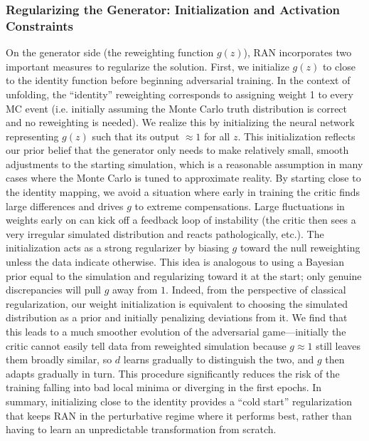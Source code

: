         \subsubsection{Regularizing the Generator: Initialization and Activation Constraints}
            On the generator side (the reweighting function $g(z)$), RAN incorporates two important measures to regularize the solution.  First, we initialize $g(z)$ to close to the identity function before beginning adversarial training.
            In the context of unfolding, the “identity” reweighting corresponds to assigning weight 1 to every MC event (i.e. initially assuming the Monte Carlo truth distribution is correct and no reweighting is needed).
            We realize this by initializing the neural network representing $g(z)$ such that its output $\approx 1$ for all $z$.
            This initialization reflects our prior belief that the generator only needs to make relatively small, smooth adjustments to the starting simulation, which is a reasonable assumption in many cases where the Monte Carlo is tuned to approximate reality.
            By starting close to the identity mapping, we avoid a situation where early in training the critic finds large differences and drives $g$ to extreme compensations.
            Large fluctuations in weights early on can kick off a feedback loop of instability (the critic then sees a very irregular simulated distribution and reacts pathologically, etc.).
            The initialization acts as a strong regularizer by biasing $g$ toward the null reweighting unless the data indicate otherwise.
            This idea is analogous to using a Bayesian prior equal to the simulation and regularizing toward it at the start; only genuine discrepancies will pull $g$ away from \(1\).
            Indeed, from the perspective of classical regularization, our weight initialization is equivalent to choosing the simulated distribution as a prior and initially penalizing deviations from it.
            We find that this leads to a much smoother evolution of the adversarial game---initially the critic cannot easily tell data from reweighted simulation because $g\approx 1$ still leaves them broadly similar, so $d$ learns gradually to distinguish the two, and $g$ then adapts gradually in turn.
            This procedure significantly reduces the risk of the training falling into bad local minima or diverging in the first epochs.
            In summary, initializing close to the identity provides a “cold start” regularization that keeps RAN in the perturbative regime where it performs best, rather than having to learn an unpredictable transformation from scratch.\kd{}


